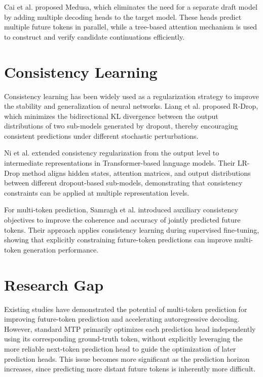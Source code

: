 Cai et al.\cite{cai2024medusa} proposed Medusa, which eliminates the need for a separate draft model by adding multiple decoding heads to the target model. These heads predict multiple future tokens in parallel, while a tree-based attention mechanism is used to construct and verify candidate continuations efficiently.

\section{Consistency Learning}\label{sec:2-consistency_learning}

Consistency learning has been widely used as a regularization strategy to improve the stability and generalization of neural networks. Liang et al.\cite{liang2021rdrop} proposed R-Drop, which minimizes the bidirectional KL divergence between the output distributions of two sub-models generated by dropout, thereby encouraging consistent predictions under different stochastic perturbations.

Ni et al.\cite{ni2024lrdrop} extended consistency regularization from the output level to intermediate representations in Transformer-based language models. Their LR-Drop method aligns hidden states, attention matrices, and output distributions between different dropout-based sub-models, demonstrating that consistency constraints can be applied at multiple representation levels.

For multi-token prediction, Samragh et al.\cite{samragh2025future} introduced auxiliary consistency objectives to improve the coherence and accuracy of jointly predicted future tokens. Their approach applies consistency learning during supervised fine-tuning, showing that explicitly constraining future-token predictions can improve multi-token generation performance.

\section{Research Gap}\label{sec:2-research_gap}

Existing studies have demonstrated the potential of multi-token prediction for improving future-token prediction and accelerating autoregressive decoding. However, standard MTP primarily optimizes each prediction head independently using its corresponding ground-truth token, without explicitly leveraging the more reliable next-token prediction head to guide the optimization of later prediction heads. This issue becomes more significant as the prediction horizon increases, since predicting more distant future tokens is inherently more difficult.

